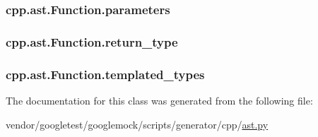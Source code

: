 \subsubsection[{\texorpdfstring{parameters}{parameters}}]{\setlength{\rightskip}{0pt plus 5cm}cpp.\+ast.\+Function.\+parameters}\hypertarget{classcpp_1_1ast_1_1Function_a0e61ef47af9cf2fd4402dbd8cab631ef}{}\label{classcpp_1_1ast_1_1Function_a0e61ef47af9cf2fd4402dbd8cab631ef}
\subsubsection[{\texorpdfstring{return\+\_\+type}{return_type}}]{\setlength{\rightskip}{0pt plus 5cm}cpp.\+ast.\+Function.\+return\+\_\+type}\hypertarget{classcpp_1_1ast_1_1Function_af750fd788d7ab33163ee066534780212}{}\label{classcpp_1_1ast_1_1Function_af750fd788d7ab33163ee066534780212}
\subsubsection[{\texorpdfstring{templated\+\_\+types}{templated_types}}]{\setlength{\rightskip}{0pt plus 5cm}cpp.\+ast.\+Function.\+templated\+\_\+types}\hypertarget{classcpp_1_1ast_1_1Function_a57bb03218bade3240137a0d91c467cb6}{}\label{classcpp_1_1ast_1_1Function_a57bb03218bade3240137a0d91c467cb6}


The documentation for this class was generated from the following file\+:\begin{DoxyCompactItemize}
\item 
vendor/googletest/googlemock/scripts/generator/cpp/\hyperlink{ast_8py}{ast.\+py}\end{DoxyCompactItemize}
